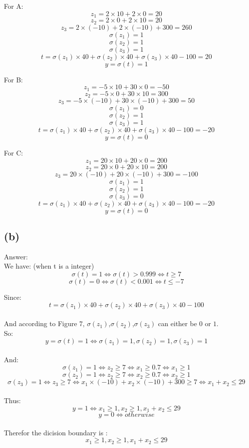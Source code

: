 \documentclass[18pt, A4]{article}
\begin{document}
    For A:
        $$z_1 = 2\times 10+2\times0 = 20$$
        $$z_2 = 2\times0+2\times10 = 20$$
        $$z_3 = 2\times(-10) + 2\times(-10) +300= 260$$
        $$\sigma(z_1) = 1$$
        $$\sigma(z_2) = 1$$
        $$\sigma(z_3) = 1$$
        $$t = \sigma(z_1)\times 40 + \sigma(z_2)\times 40 + \sigma(z_3)\times 40 -100 = 20$$
        $$y = \sigma(t) = 1$$
    
    For B:
        $$z_1 = -5\times 10+30\times0 = -50$$
        $$z_2 = -5\times0+30\times10 = 300$$
        $$z_3 = -5\times(-10) + 30\times(-10) +300= 50$$
        $$\sigma(z_1) = 0$$
        $$\sigma(z_2) = 1$$
        $$\sigma(z_3) = 1$$
        $$t = \sigma(z_1)\times 40 + \sigma(z_2)\times 40 + \sigma(z_3)\times 40 -100 = -20$$
        $$y = \sigma(t) = 0$$
        
    For C:
        $$z_1 = 20\times 10+20\times0 = 200$$
        $$z_2 = 20\times0+20\times10 = 200$$
        $$z_3 = 20\times(-10) + 20\times(-10) +300= -100$$
        $$\sigma(z_1) = 1$$
        $$\sigma(z_2) = 1$$
        $$\sigma(z_3) = 0$$
        $$t = \sigma(z_1)\times 40 + \sigma(z_2)\times 40 + \sigma(z_3)\times 40 -100 = -20$$
        $$y = \sigma(t) = 0$$

    \subsection*{(b)}
    Answer:
    \\

    We have: (when t is a integer)
    $$
        \sigma(t) = 1 \Longleftrightarrow \sigma(t) > 0.999 \Longleftrightarrow t\ge 7 
    $$
    $$
        \sigma(t) = 0 \Longleftrightarrow \sigma(t) < 0.001 \Longleftrightarrow t\le -7   
    $$

    Since:
    $$
         t = \sigma(z_1)\times 40 + \sigma(z_2)\times 40 + \sigma(z_3)\times 40 -100 
    $$
    \\

    And according to Figure 7, $\sigma(z_1)$,$\sigma(z_2)$,$\sigma(z_3)$ can either be $0$ or $1$.
    \\

    So:
    $$
        y = \sigma(t) = 1 \Longleftrightarrow \sigma(z_1) = 1, \sigma(z_2) = 1, \sigma(z_3) = 1
    $$
    \\

    And: 
    $$\sigma(z_1) = 1 \Longleftrightarrow z_2 \ge 7 \Longleftrightarrow x_1 \ge 0.7 \Longleftrightarrow x_1 \ge 1$$
    $$\sigma(z_2) = 1 \Longleftrightarrow z_2 \ge 7 \Longleftrightarrow x_2 \ge 0.7 \Longleftrightarrow x_2 \ge 1$$
    $$\sigma(z_3) = 1 \Longleftrightarrow z_3 \ge 7 \Longleftrightarrow x_1\times(-10) +x_2\times(-10) + 300 \ge 7 \Longleftrightarrow x_1 + x_2 \le 29$$
    \\
    
    Thus:
    $$y = 1 \Longleftrightarrow x_1\ge1, x_2\ge1, x_1+x_2\le29$$
    $$y = 0 \Longleftrightarrow otherwise$$
    \\

    Therefor the dicision boundary is :
    $$
        x_1\ge1, x_2\ge1, x_1+x_2\le29
    $$
    
\end{document}
